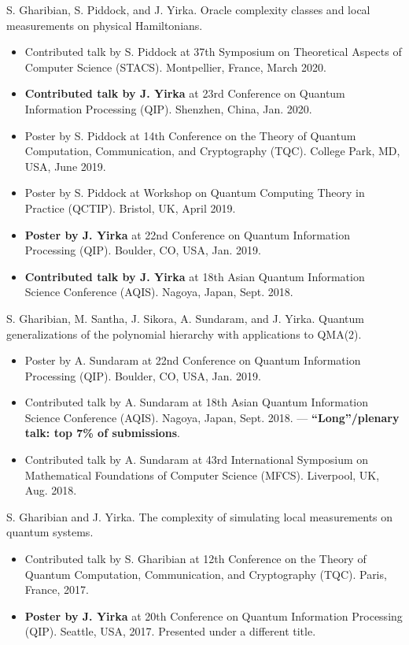 \documentclass[11pt,letterpaper,serif]{moderncv}
\newcommand{\pubItemSep}{0.3em}
\begin{document}
S. Gharibian, S. Piddock, and J. Yirka. Oracle complexity classes and local measurements on physical Hamiltonians.
\begin{adjustwidth}{.25in}{}
	\begin{itemize}[itemsep=\pubItemSep]
		\item Contributed talk by S. Piddock at 37th Symposium on Theoretical Aspects of Computer Science (STACS). Montpellier, France, March 2020.
		\item \textbf{Contributed talk by J. Yirka} at 23rd Conference on Quantum Information Processing (QIP). Shenzhen, China, Jan. 2020.
		\item Poster by S. Piddock at 14th Conference on the Theory of Quantum Computation, Communication, and Cryptography (TQC). College Park, MD, USA, June 2019.
		\item Poster by S. Piddock at Workshop on Quantum Computing Theory in Practice (QCTIP). Bristol, UK, April 2019.
		\item \textbf{Poster by J. Yirka} at 22nd Conference on Quantum Information Processing (QIP). Boulder, CO, USA, Jan. 2019.
		\item \textbf{Contributed talk by J. Yirka} at 18th Asian Quantum Information Science Conference (AQIS). Nagoya, Japan, Sept. 2018.
	\end{itemize}
\end{adjustwidth}

S. Gharibian, M. Santha, J. Sikora, A. Sundaram, and J. Yirka. Quantum generalizations of the polynomial hierarchy with applications to QMA(2).
\begin{adjustwidth}{.25in}{} 
	\begin{itemize}[itemsep=\pubItemSep]
		\item Poster by A. Sundaram at 22nd Conference on Quantum Information Processing (QIP). Boulder, CO, USA, Jan. 2019.
		\item Contributed talk by A. Sundaram at 18th Asian Quantum Information Science Conference (AQIS). Nagoya, Japan, Sept. 2018. --- \textbf{``Long''/plenary talk: top 7\% of submissions}.
		\item Contributed talk by A. Sundaram at 43rd International	Symposium on Mathematical Foundations of Computer Science (MFCS). Liverpool, UK, Aug. 2018.
	\end{itemize}
\end{adjustwidth}

S. Gharibian and J. Yirka. The complexity of simulating local measurements on quantum systems.
\begin{adjustwidth}{.25in}{}
	\begin{itemize}[itemsep=\pubItemSep]
		\item Contributed talk by S. Gharibian at 12th Conference on the Theory of Quantum Computation, Communication,
		and Cryptography (TQC). Paris, France, 2017.
		\item \textbf{Poster by J. Yirka} at 20th Conference on Quantum Information Processing (QIP). Seattle, USA, 2017. Presented under a different title.
	\end{itemize}
\end{adjustwidth}
\end{document}
